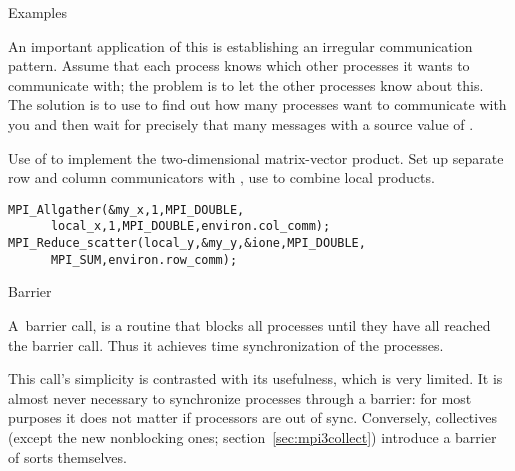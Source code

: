  {Examples}

An important application of this is establishing an irregular
communication pattern.  Assume that each process knows which
other processes it wants to communicate with; the problem is to
let the other processes know about this.
The solution is to use  to find out how many processes
want to communicate with you
and then wait for precisely that many messages
with a source value of .

Use of  to implement the two-dimensional
matrix-vector product.
Set up separate row and column communicators with
, use  to combine
local products.
%
\begin{lstlisting}
MPI_Allgather(&my_x,1,MPI_DOUBLE,
   	  local_x,1,MPI_DOUBLE,environ.col_comm);
MPI_Reduce_scatter(local_y,&my_y,&ione,MPI_DOUBLE,
	  MPI_SUM,environ.row_comm);
\end{lstlisting}

 {Barrier}
\label{sec:barrier}

A~barrier call,
%
%
is a
routine that blocks all processes until they have all reached the barrier
call. Thus it achieves time synchronization of the processes.

This call's simplicity is contrasted with its usefulness, which
is very limited. It is almost never necessary to synchronize processes
through a barrier: for most purposes it does not matter if processors
are out of sync. Conversely, collectives (except the new nonblocking
ones; section~\ref{sec:mpi3collect}) introduce a barrier of sorts themselves.

